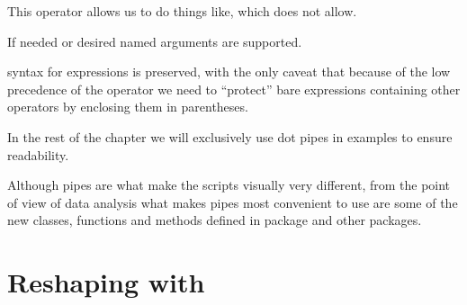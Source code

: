 \documentclass[krantz2]{krantz}\usepackage{knitr}%
\begin{document}
This operator allows us to do things like, which \Roperator{\%>\%} does not allow.

\begin{knitrout}\footnotesize
{}\color{fgcolor}
\end{knitrout}

If needed or desired named arguments are supported.

\begin{knitrout}\footnotesize
{}\color{fgcolor}
\end{knitrout}

\begin{warningbox}
\Rlang syntax for expressions is preserved, with the only caveat that because of the low precedence of the  operator we need to ``protect'' bare expressions containing other operators by enclosing them in parentheses.
\end{warningbox}

In the rest of the chapter we will exclusively use dot pipes in examples to ensure readability.

Although pipes are what make the scripts visually very different, from the point of view of data analysis what makes pipes most convenient to use are some of the new classes, functions and methods defined in package  and other  packages.

\section{Reshaping with }
\end{document}
